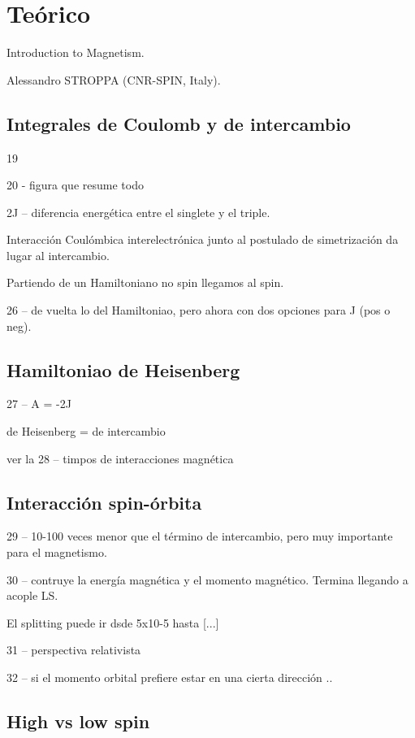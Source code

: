 \section{Teórico}

   Introduction to Magnetism.

  	Alessandro STROPPA (CNR-SPIN, Italy).

\subsection{Integrales de Coulomb y de intercambio}

  19

  20 - figura que resume todo

  2J -- diferencia energética entre el singlete y el triple.

  Interacción Coulómbica interelectrónica junto al postulado de simetrización da lugar al intercambio.

  Partiendo de un Hamiltoniano no spin llegamos al spin.

  26 -- de vuelta lo del Hamiltoniao, pero ahora con dos opciones para J (pos o neg).

\subsection{Hamiltoniao de Heisenberg}

  27 -- A = -2J

  de Heisenberg = de intercambio

  ver la 28 -- timpos de interacciones magnética

\subsection{Interacción spin-órbita}

  29 -- 10-100 veces menor que el término de intercambio, pero muy importante para el magnetismo.

  30 -- contruye la energía magnética y el momento magnético. Termina llegando a acople LS.

  El splitting puede ir dsde 5x10-5 hasta [...]

  31 -- perspectiva relativista

  32 -- si el momento orbital prefiere estar en una cierta dirección ..

\subsection{High vs low spin}

